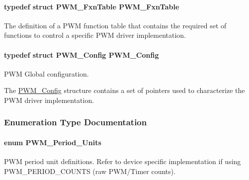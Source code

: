 \paragraph[{P\+W\+M\+\_\+\+Fxn\+Table}]{\setlength{\rightskip}{0pt plus 5cm}typedef struct {\bf P\+W\+M\+\_\+\+Fxn\+Table}  {\bf P\+W\+M\+\_\+\+Fxn\+Table}}\label{_p_w_m_8h_a05890cc4f17c4343ff0ee612561fe267}


The definition of a P\+W\+M function table that contains the required set of functions to control a specific P\+W\+M driver implementation. 

\paragraph[{P\+W\+M\+\_\+\+Config}]{\setlength{\rightskip}{0pt plus 5cm}typedef struct {\bf P\+W\+M\+\_\+\+Config}  {\bf P\+W\+M\+\_\+\+Config}}\label{_p_w_m_8h_a007c9e36d0b1afcff70e1f2201845236}


P\+W\+M Global configuration. 

The \hyperlink{struct_p_w_m___config}{P\+W\+M\+\_\+\+Config} structure contains a set of pointers used to characterize the P\+W\+M driver implementation. 

\subsubsection{Enumeration Type Documentation}
\paragraph[{P\+W\+M\+\_\+\+Period\+\_\+\+Units}]{\setlength{\rightskip}{0pt plus 5cm}enum {\bf P\+W\+M\+\_\+\+Period\+\_\+\+Units}}\label{_p_w_m_8h_a11aa442e82549992c98729216d64fd63}


P\+W\+M period unit definitions. Refer to device specific implementation if using P\+W\+M\+\_\+\+P\+E\+R\+I\+O\+D\+\_\+\+C\+O\+U\+N\+T\+S (raw P\+W\+M/\+Timer counts). 

